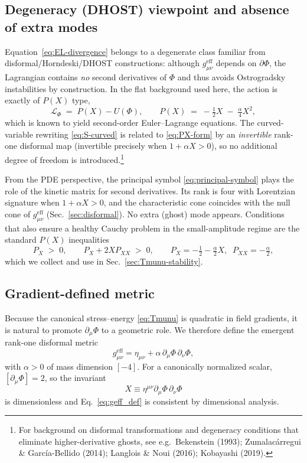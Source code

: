 \documentclass{article}
\begin{document}
\subsection{Degeneracy (DHOST) viewpoint and absence of extra modes}
\label{sec:DHOST}

Equation~\eqref{eq:EL-divergence} belongs to a degenerate class familiar from disformal/Horndeski/DHOST constructions: although $g^{\mathrm{eff}}_{\mu\nu}$ depends on $\partial\Phi$, the Lagrangian contains \emph{no} second derivatives of $\Phi$ and thus avoids Ostrogradsky instabilities by construction. In the flat background used here, the action is exactly of $P(X)$ type,
\begin{equation}
\mathcal{L}_\Phi \;=\; P(X)-U(\Phi),
\qquad
P(X) \;=\; -\tfrac12 X \;-\; \tfrac{\alpha}{4}X^2,
\label{eq:PX-form}
\end{equation}
which is known to yield second-order Euler–Lagrange equations. The curved-variable rewriting \eqref{eq:S-curved} is related to \eqref{eq:PX-form} by an \emph{invertible} rank-one disformal map (invertible precisely when $1+\alpha X>0$), so no additional degree of freedom is introduced.\footnote{For background on disformal transformations and degeneracy conditions that eliminate higher-derivative ghosts, see e.g.\ Bekenstein (1993); Zumalacárregui \& García-Bellido (2014); Langlois \& Noui (2016); Kobayashi (2019).}

From the PDE perspective, the principal symbol \eqref{eq:principal-symbol} plays the role of the kinetic matrix for second derivatives. Its rank is four with Lorentzian signature when $1+\alpha X>0$, and the characteristic cone coincides with the null cone of $g^{\mathrm{eff}}_{\mu\nu}$ (Sec.~\ref{sec:disformal}). No extra (ghost) mode appears. Conditions that also ensure a healthy Cauchy problem in the small-amplitude regime are the standard $P(X)$ inequalities
\begin{equation}
P_X \;>\; 0,
\qquad
P_X+2X P_{XX} \;>\; 0,
\qquad
P_X = -\tfrac12 - \tfrac{\alpha}{2}X,\;\; P_{XX}=-\tfrac{\alpha}{2},
\label{eq:no-ghost-no-gradient}
\end{equation}
which we collect and use in Sec.~\ref{sec:Tmunu-stability}.

\subsection{Gradient-defined metric}

Because the canonical stress–energy \eqref{eq:Tmunu} is quadratic in field gradients, it is natural to promote $\partial_\mu\Phi$ to a geometric role. We therefore define the emergent rank-one disformal metric
\begin{equation}
g^{\mathrm{eff}}_{\mu\nu} = \eta_{\mu\nu} + \alpha\,\partial_\mu\Phi\,\partial_\nu\Phi ,
\label{eq:geff_def}
\end{equation}
with $\alpha>0$ of mass dimension $[-4]$. For a canonically normalized scalar, $[\partial_\mu\Phi]=2$, so the invariant
\begin{equation}
X \equiv \eta^{\mu\nu}\partial_\mu\Phi\,\partial_\nu\Phi
\label{eq:Xdef}
\end{equation}
is dimensionless and Eq.~\eqref{eq:geff_def} is consistent by dimensional analysis.
\end{document}
